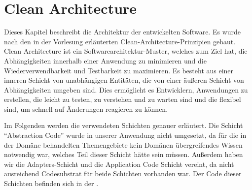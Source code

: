 \chapter{Clean Architecture}\label{CA}

Dieses Kapitel beschreibt die Architektur der entwickelten Software. Es wurde nach den in der Vorlesung erläuterten Clean-Architecture-Prinzipien gebaut. Clean Architecture ist ein Softwarearchitektur-Muster, welches zum Ziel hat, die Abhängigkeiten innerhalb einer Anwendung zu minimieren und die Wiederverwendbarkeit und Testbarkeit zu maximieren. Es besteht aus einer inneren Schicht von unabhängigen Entitäten, die von einer äußeren Schicht von Abhängigkeiten umgeben sind. Dies ermöglicht es Entwicklern, Anwendungen zu erstellen, die leicht zu testen, zu verstehen und zu warten sind und die flexibel sind, um schnell auf Änderungen reagieren zu können.

Im Folgenden werden die verwendeten Schichten genauer erläutert. Die Schicht \enquote{Abstraction Code} wurde in unserer Anwendung nicht umgesetzt, da für die in der Domäne behandelten Themengebiete kein Domänen übergreifendes Wissen notwendig war, welches Teil dieser Schicht hätte sein müssen. 
Außerdem haben wir die Adapters-Schicht und die Application Code Schicht vereint, da nicht ausreichend Codesubstrat für beide Schichten vorhanden war. Der Code dieser Schichten befinden sich in der \href{https://github.com/MichaelaHaag/RezeptApp/tree/main/1-Adapter}{}.

